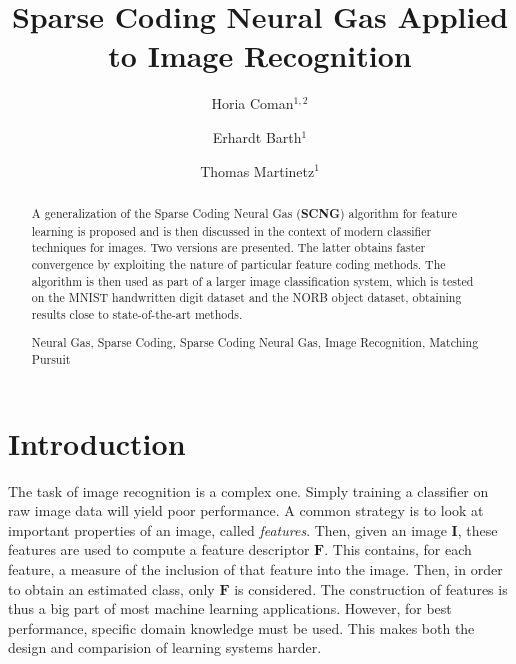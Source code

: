 \documentclass[runningheads,a4paper]{llncs}
\newcommand{\keywords}[1]{\par\addvspace\baselineskip
\noindent\keywordname\enspace\ignorespaces#1}
\begin{document}
\mainmatter

\title{Sparse Coding Neural Gas Applied to Image Recognition}

\author{Horia Coman$^{1,2}$ \and Erhardt Barth$^{1}$ \and Thomas Martinetz$^{1}$}



\maketitle

\begin{abstract} A generalization of the Sparse Coding Neural Gas (\textbf{SCNG}) algorithm for feature learning is proposed and is then discussed in the context of modern classifier techniques for images. Two versions are presented. The latter obtains faster convergence by exploiting the nature of particular feature coding methods. The algorithm is then used as part of a larger image classification system, which is tested on the MNIST handwritten digit dataset and the NORB object dataset, obtaining results close to state-of-the-art methods.
\keywords{Neural Gas, Sparse Coding, Sparse Coding Neural Gas, Image Recognition, Matching Pursuit}
\end{abstract}

\section{Introduction}

The task of image recognition is a complex one. Simply training a classifier on raw image data will yield poor performance. A common strategy is to look at important properties of an image, called \emph{features}. Then, given an image $\textbf{I}$, these features are used to compute a feature descriptor $\textbf{F}$. This contains, for each feature, a measure of the inclusion of that feature into the image. Then, in order to obtain an estimated class, only $\textbf{F}$ is considered. The construction of features is thus a big part of most machine learning applications. However, for best performance, specific domain knowledge must be used. This makes both the design and comparision of learning systems harder.
\end{document}
